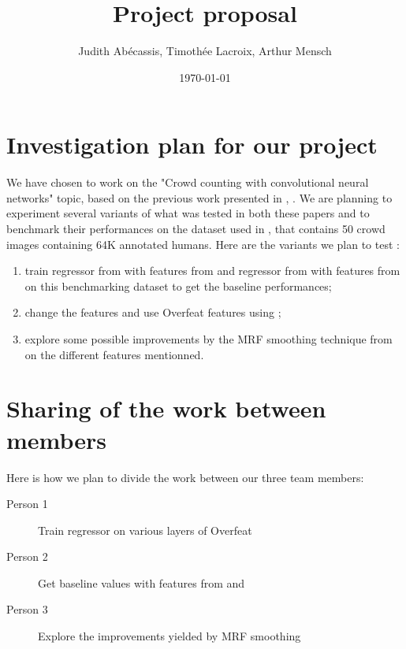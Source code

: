 \documentclass[a4paper,11pt, french]{article}
\begin{document}
\title{Project proposal}
\author{Judith Abécassis, Timothée Lacroix, Arthur Mensch} 
\date{\today}
\maketitle

\section*{Investigation plan for our project}

We have chosen to work on the "Crowd counting with convolutional neural networks" topic, based on the previous work presented in \cite{basepaper}, \cite{multisource}. We are planning to experiment several variants of what was tested in both these papers and to benchmark their performances on the dataset used in \cite{multisource}, that contains 50 crowd images containing 64K annotated humans. Here are the variants we plan to test :
\begin{enumerate}
\item train regressor from \cite{basepaper} with features from \cite{basepaper} and regressor from \cite{basepaper} with features from \cite{multisource} on this benchmarking dataset to get the baseline performances;
\item change the features and use Overfeat features using \cite{overfeat};
\item explore some possible improvements by the MRF smoothing technique from \cite{multisource} on the different features mentionned.
\end{enumerate}

\section*{Sharing of the work between members}
Here is how we plan to divide the work between our three team members:
\begin{description}
\item[Person 1] Train regressor on various layers of Overfeat
\item[Person 2] Get baseline values with features from \cite{basepaper} and \cite{multisource}
\item[Person 3] Explore the improvements yielded by MRF smoothing
\end{description}
\end{document}
